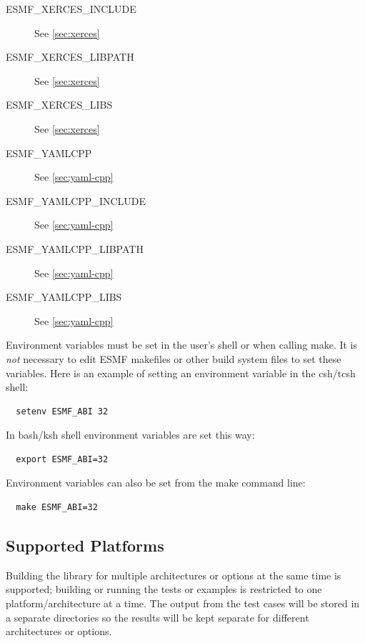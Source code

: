 \begin{description}
\item[ESMF\_XERCES\_INCLUDE]
See \ref{sec:xerces}

\item[ESMF\_XERCES\_LIBPATH]
See \ref{sec:xerces}

\item[ESMF\_XERCES\_LIBS]
See \ref{sec:xerces}

\item[ESMF\_YAMLCPP]
See \ref{sec:yaml-cpp}

\item[ESMF\_YAMLCPP\_INCLUDE]
See \ref{sec:yaml-cpp}

\item[ESMF\_YAMLCPP\_LIBPATH]
See \ref{sec:yaml-cpp}

\item[ESMF\_YAMLCPP\_LIBS]
See \ref{sec:yaml-cpp}

\end{description}

Environment variables must be set in the user's shell or when calling make. It
is {\em not} necessary to edit ESMF makefiles or other build system files to set
these variables. Here is an example of setting an environment variable in the
csh/tcsh shell:

\begin{verbatim}
  setenv ESMF_ABI 32
\end{verbatim}

In bash/ksh shell environment variables are set this way:

\begin{verbatim}
  export ESMF_ABI=32
\end{verbatim}

Environment variables can also be set from the make command line:

\begin{verbatim}
  make ESMF_ABI=32
\end{verbatim}

\subsection{Supported Platforms}


Building the library for multiple architectures or options at the same
time is supported; building or running the tests or examples is restricted
to one platform/architecture at a time.  The output from the test cases
will be stored in a separate directories so the results will be kept
separate for different architectures or options.

